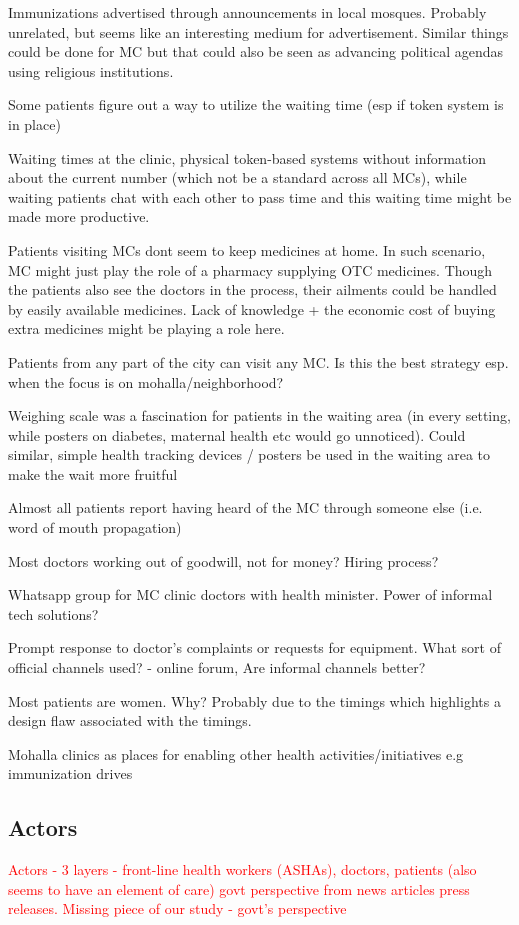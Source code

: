 Immunizations advertised through announcements in local mosques. Probably unrelated, but seems like an interesting medium for advertisement. Similar things could be done for MC but that could also be seen as advancing political agendas using religious institutions.

Some patients figure out a way to utilize the waiting time (esp if token system is in place)

Waiting times at the clinic, physical token-based systems without information about the current number (which not be a standard across all MCs), while waiting patients chat with each other to pass time and this waiting time might be made more productive.

Patients visiting MCs dont seem to keep medicines at home. In such scenario, MC might just play the role of a pharmacy supplying OTC medicines. Though the patients also see the doctors in the process, their ailments could be handled by easily available medicines. Lack of knowledge + the economic cost of buying extra medicines might be playing a role here.

Patients from any part of the city can visit any MC. Is this the best strategy esp. when the focus is on mohalla/neighborhood?

Weighing scale was a fascination for patients in the waiting area (in every setting, while posters on diabetes, maternal health etc would go unnoticed). Could similar, simple health tracking devices / posters be used in the waiting area to make the wait more fruitful

Almost all patients report having heard of the MC through someone else (i.e. word of mouth propagation)

Most doctors working out of goodwill, not for money? Hiring process?

Whatsapp group for MC clinic doctors with health minister. Power of informal tech solutions?

Prompt response to doctor's complaints or requests for equipment. What sort of official channels used? - online forum, Are informal channels better?

Most patients are women. Why? Probably due to the timings which highlights a design flaw associated with the timings.

Mohalla clinics as places for enabling other health activities/initiatives e.g immunization drives

\subsection{Actors}
\textcolor{red}{
Actors - 3 layers - front-line health workers (ASHAs), doctors, patients (also seems to have an element of care)
govt perspective from news articles press releases. Missing piece of our study - govt's perspective}

